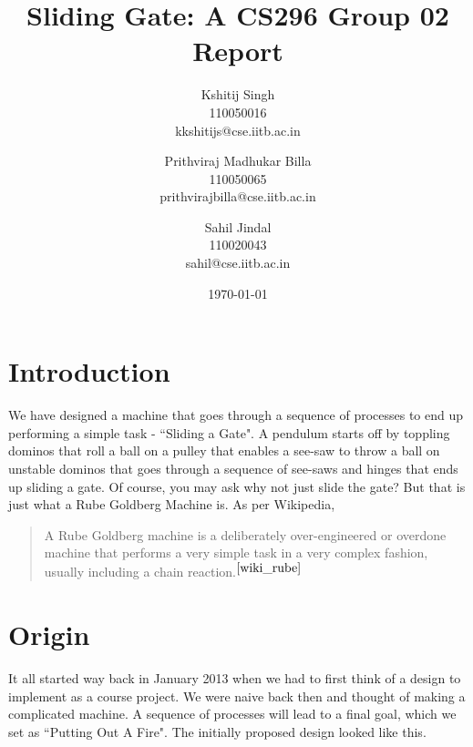 \documentclass[a4paper,11pt]{article}
\begin{document}
\title{\textbf{Sliding Gate: A CS296 Group 02 Report}}

\author{
Kshitij Singh\\
110050016\\
kkshitijs@cse.iitb.ac.in
\and
Prithviraj Madhukar Billa\\
110050065\\
prithvirajbilla@cse.iitb.ac.in
\and
Sahil Jindal\\
110020043\\
sahil@cse.iitb.ac.in
}

\date{\today}
\maketitle

\setlength{\parindent}{0 cm}
\section{Introduction}

We have designed a machine that goes through a sequence of processes to end up performing a simple task - ``Sliding a Gate". A pendulum starts off by toppling dominos that roll a ball on a pulley that enables a see-saw to throw a ball on unstable dominos that goes through a sequence of see-saws and hinges that ends up sliding a gate. Of course, you may ask why not just slide the gate? But that is just what a Rube Goldberg Machine is. As per Wikipedia,

\begin{quote}
A Rube Goldberg machine is a deliberately over-engineered or overdone machine that performs a very simple task in a very complex fashion, usually including a chain reaction.$^{\cite{wiki_rube}}$ 
\end{quote}

\section{Origin}

It all started way back in January 2013 when we had to first think of a design to implement as a course project. We were naive back then and thought of making a complicated machine. A sequence of processes will lead to a final goal, which we set as ``Putting Out A Fire". The initially proposed design looked like this.
\end{document}

